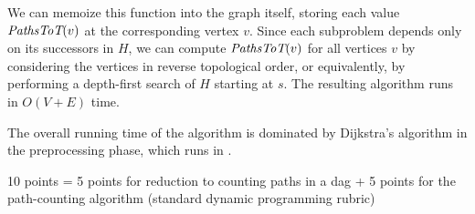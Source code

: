 \documentclass[11pt]{article}
\begin{document}
\begin{enumerate}
\begin{solution}
We can memoize this function into the graph itself, storing each value $\emph{PathsToT}(v)$ at the corresponding vertex $v$.  Since each subproblem depends only on its successors in $H$, we can compute $\emph{PathsToT}(v)$ for all vertices $v$ by considering the vertices in reverse topological order, or equivalently, by performing a depth-first search of $H$ starting at $s$.  The resulting algorithm runs in $O(V+E)$ time.

The overall running time of the algorithm is dominated by Dijkstra’s algorithm in the preprocessing phase, which runs in .
\end{solution}

\begin{rubric}
10 points = 5 points for reduction to counting paths in a dag + 5 points for the path-counting algorithm (standard dynamic programming rubric)
\end{rubric}

\end{enumerate}
\end{document}
